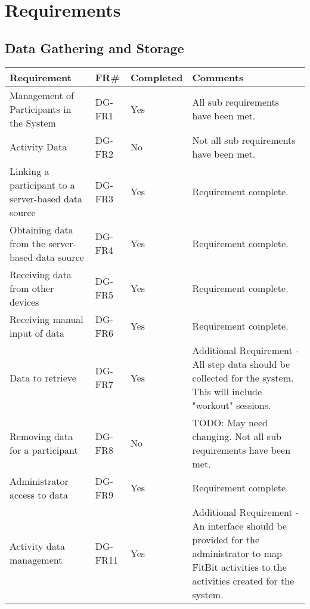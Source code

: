 \chapter{Requirements}

\section{Data Gathering and Storage}
\begin{tabular}{ |p{5cm}|l|l|p{8cm}|}
\hline
\textbf{Requirement}	&	\textbf{FR\#}	&	\textbf{Completed}	&	\textbf{Comments} \\
\hline
Management of Participants in the System			& DG-FR1	& Yes	& All sub requirements have been met. \\
\hline
Activity Data										& DG-FR2	& No	& Not all sub requirements have been met. \\
\hline
Linking a participant to a server-based data source	& DG-FR3	& Yes	& Requirement complete. \\
\hline
Obtaining data from the server-based data source	& DG-FR4	& Yes	& Requirement complete. \\
\hline
Receiving data from other devices					& DG-FR5	& Yes	& Requirement complete. \\
\hline
Receiving manual input of data						& DG-FR6	& Yes	& Requirement complete. \\
\hline
Data to retrieve 									& DG-FR7	& Yes	& Additional Requirement - All step data should be collected for the system. This will include "workout" sessions. \\
\hline
Removing data for a participant						& DG-FR8	& No	& TODO: May need changing. Not all sub requirements have been met. \\
\hline
Administrator access to data						& DG-FR9	& Yes	& Requirement complete. \\
\hline
Activity data management							& DG-FR11	& Yes	& Additional Requirement - An interface should be provided for the administrator to map FitBit activities to the activities created for the system. \\
\hline
\end{tabular}


